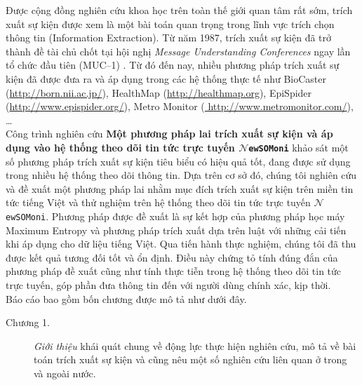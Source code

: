 %
\clearpage
\thispagestyle{empty}
%
\begin{preface}
	\bigskip
    \noindent Được cộng đồng nghiên cứu khoa học trên toàn thế giới quan tâm rất
    sớm, trích xuất sự kiện được xem là một bài toán quan trọng trong lĩnh vực
    trích chọn thông tin (Information Extraction). Từ năm 1987, trích xuất sự
    kiện đã trở thành đề tài chủ chốt tại hội nghị \emph{Message Understanding
    Conferences} ngay lần tổ
	chức đầu tiên (MUC--1) \cite{RB96}. Từ đó đến nay, nhiều phương pháp trích
    xuất sự kiện đã được đưa ra  và áp dụng trong các hệ thống thực tế như
    BioCaster (\href{http://born.nii.ac.jp/}{http://born.nii.ac.jp/}), HealthMap
    (\href{http://healthmap.org}{http://healthmap.org}), EpiSpider\\
    (\href{http://www.epispider.org/}{http://www.epispider.org/}), Metro
    Monitor (\href{ http://www.metromonitor.com/}{
    http://www.metromonitor.com/}), \ldots \\
   \noindent Công trình nghiên cứu \textbf{Một phương pháp lai trích xuất sự kiện và áp
   dụng vào hệ thống theo dõi tin tức trực tuyến  $\mathcal{N}$\texttt{ewSOMoni}} khảo sát một số phương pháp trích xuất sự
    kiện tiêu biểu có hiệu quả tốt, đang được sử dụng trong nhiều hệ thống
    theo dõi thông tin. Dựa trên cơ sở đó, chúng tôi  nghiên cứu và đề xuất một phương
    pháp lai nhằm mục đích trích xuất sự kiện trên miền tin tức tiếng Việt và
    thử nghiệm trên hệ thống theo dõi tin tức trực tuyến
    $\mathcal{N}$\texttt{ewSOMoni}. Phương pháp được đề xuất là sự kết hợp của
    phương pháp học máy Maximum Entropy và phương pháp trích xuất dựa trên
    luật với những cải tiến khi áp dụng cho dữ liệu tiếng Việt. Qua tiến hành
    thực nghiệm, chúng tôi đã thu được kết quả tương đối tốt và ổn định. Điều
    này chứng tỏ tính đúng đắn của phương pháp đề xuất cũng như tính thực tiễn
    trong hệ thống theo dõi tin tức trực tuyến, góp phần đưa thông tin đến với
    người dùng chính xác, kịp thời.
    \\[0.5cm]
	\noindent Báo cáo bao gồm bốn chương được mô tả như dưới đây.

	\begin{description}
		\item[Chương 1.] \emph{Giới thiệu} khái quát chung về động lực thực hiện
		nghiên cứu, mô tả về bài toán trích xuất sự kiện và cũng nêu một số
		nghiên cứu liên quan ở trong và ngoài nước. 



\end{description}
\end{preface}
